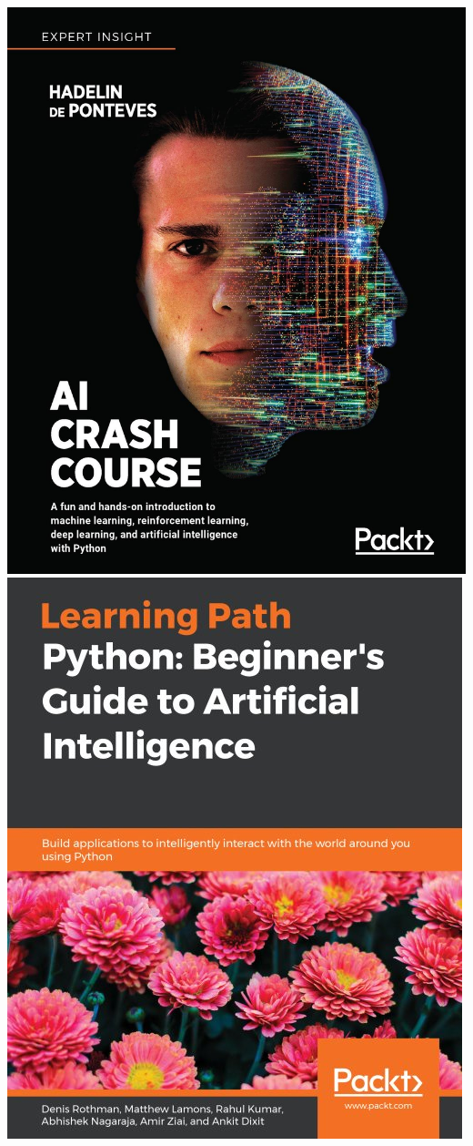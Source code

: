 \documentclass{book}
\begin{document}
\begin{center}
    \includegraphics[scale = 0.181]{ai-crash-course.jpg}
    \includegraphics[scale = 0.4]{python-beginner-guide.jpg}

\end{center}
\end{document}
